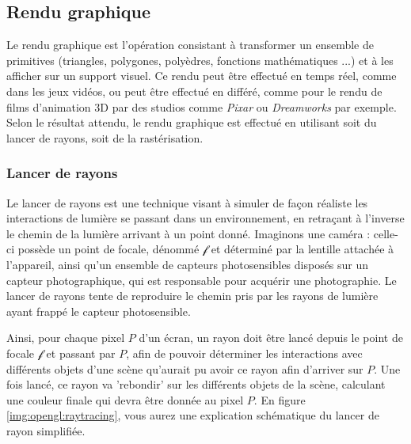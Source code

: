 

\subsection{Rendu graphique}
{
    Le rendu graphique est l'opération consistant à transformer un ensemble de primitives (triangles, polygones, polyèdres, fonctions mathématiques ...) et à les afficher sur un support visuel. Ce rendu peut être effectué en temps réel, comme dans les jeux vidéos, ou peut être effectué en différé, comme pour le rendu de films d'animation 3D par des studios comme \textit{Pixar} ou \textit{Dreamworks} par exemple. Selon le résultat attendu, le rendu graphique est effectué en utilisant soit du lancer de rayons, soit de la rastérisation.
    
    \subsubsection{Lancer de rayons}
    {
        Le lancer de rayons est une technique visant à simuler de façon réaliste les interactions de lumière se passant dans un environnement, en retraçant à l'inverse le chemin de la lumière arrivant à un point donné. Imaginons une caméra : celle-ci possède un point de focale, dénommé $\mathcal{f}$ et déterminé par la lentille attachée à l'appareil, ainsi qu'un ensemble de capteurs photosensibles disposés sur un capteur photographique, qui est responsable pour acquérir une photographie. Le lancer de rayons tente de reproduire le chemin pris par les rayons de lumière ayant frappé le capteur photosensible.

        Ainsi, pour chaque pixel $P$ d'un écran, un rayon doit être lancé depuis le point de focale $\mathcal{f}$ et passant par $P$, afin de pouvoir déterminer les interactions avec différents objets d'une scène qu'aurait pu avoir ce rayon afin d'arriver sur $P$. Une fois lancé, ce rayon va 'rebondir' sur les différents objets de la scène, calculant une couleur finale qui devra être donnée au pixel $P$. En figure \ref{img:opengl:raytracing}, vous aurez une explication schématique du lancer de rayon simplifiée.

}}
